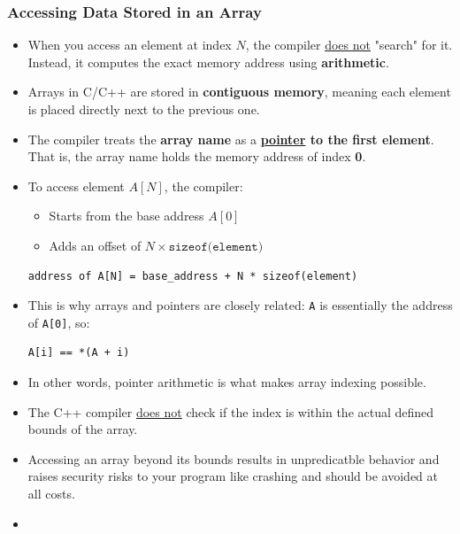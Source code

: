 \documentclass[10pt]{article}
\begin{document}
\subsubsection{Accessing Data Stored in an Array}
\begin{itemize}
\item When you access an element at index $N$, the compiler \underline{does not} "search" for it.
		Instead, it computes the exact memory address using \textbf{arithmetic}.

	\item Arrays in C/C++ are stored in \textbf{contiguous memory}, meaning each element is placed directly next to the previous one.

	\item The compiler treats the \textbf{array name} as a \textbf{\underline{pointer} to the first element}.
	That is, the array name holds the memory address of index \textbf{0}.

	\item To access element $A[N]$, the compiler:
	\begin{itemize}
		\item Starts from the base address $A[0]$
		\item Adds an offset of $N \times \texttt{sizeof(element)}$
	\end{itemize}

	\begin{verbatim}
address of A[N] = base_address + N * sizeof(element)
	\end{verbatim}

	\item This is why arrays and pointers are closely related:
	\texttt{A} is essentially the address of \texttt{A[0]}, so:
	\begin{verbatim}
A[i] == *(A + i)
	\end{verbatim}

	\item In other words, pointer arithmetic is what makes array indexing possible.

	\item The C++ compiler \underline{does not} check if the index is within the actual defined bounds of the array.

	\item Accessing an array beyond its bounds results in unpredicatble behavior and raises security risks to your program like crashing and should be avoided at all costs.

	\item {}
\end{itemize}
\end{document}
